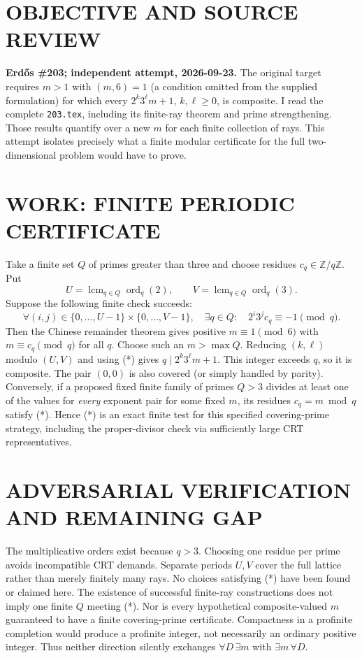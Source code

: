 \section{OBJECTIVE AND SOURCE REVIEW}
\textbf{Erd\H{o}s \#203; independent attempt, 2026-09-23.}
The original target requires $m>1$ with $(m,6)=1$ (a condition omitted from the supplied formulation) for which every $2^k3^\ell m+1$, $k,\ell\ge0$, is composite. I read the complete \texttt{203.tex}, including its finite-ray theorem and prime strengthening. Those results quantify over a new $m$ for each finite collection of rays. This attempt isolates precisely what a finite modular certificate for the full two-dimensional problem would have to prove.
\section{WORK: FINITE PERIODIC CERTIFICATE}
Take a finite set $Q$ of primes greater than three and choose residues $c_q\in\mathbb Z/q\mathbb Z$. Put
\[
U=\operatorname{lcm}_{q\in Q}\operatorname{ord}_q(2),\qquad
V=\operatorname{lcm}_{q\in Q}\operatorname{ord}_q(3).
\]
Suppose the following finite check succeeds:
\[
\forall (i,j)\in\{0,\ldots,U-1\}\times\{0,\ldots,V-1\},\quad
\exists q\in Q:\quad 2^i3^j c_q\equiv-1\pmod q.
\tag{*}
\]
Then the Chinese remainder theorem gives positive $m\equiv1\pmod6$ with $m\equiv c_q\pmod q$ for all $q$. Choose such an $m>\max Q$. Reducing $(k,\ell)$ modulo $(U,V)$ and using (*) gives $q\mid 2^k3^\ell m+1$. This integer exceeds $q$, so it is composite. The pair $(0,0)$ is also covered (or simply handled by parity).
Conversely, if a proposed fixed finite family of primes $Q>3$ divides at least one of the values for \emph{every} exponent pair for some fixed $m$, its residues $c_q=m\bmod q$ satisfy (*). Hence (*) is an exact finite test for this specified covering-prime strategy, including the proper-divisor check via sufficiently large CRT representatives.
\section{ADVERSARIAL VERIFICATION AND REMAINING GAP}
The multiplicative orders exist because $q>3$. Choosing one residue per prime avoids incompatible CRT demands. Separate periods $U,V$ cover the full lattice rather than merely finitely many rays. No choices satisfying (*) have been found or claimed here. The existence of successful finite-ray constructions does not imply one finite $Q$ meeting (*). Nor is every hypothetical composite-valued $m$ guaranteed to have a finite covering-prime certificate. Compactness in a profinite completion would produce a profinite integer, not necessarily an ordinary positive integer. Thus neither direction silently exchanges $\forall D\,\exists m$ with $\exists m\,\forall D$.
